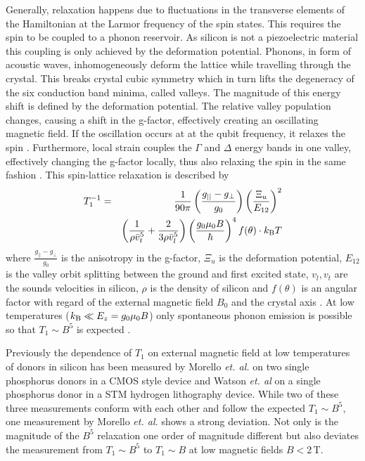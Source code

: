\documentclass[%
 reprint,
 amsmath,amssymb,
 aps,
]{revtex4-1}
\begin{document}
Generally, relaxation happens due to fluctuations in the transverse elements of the Hamiltonian at the Larmor frequency of the spin states. This requires the spin to be coupled to a phonon reservoir.
As silicon is not a piezoelectric material this coupling is only achieved by the deformation potential. Phonons, in form of acoustic waves, inhomogeneously deform the lattice while travelling through the crystal. This breaks crystal cubic symmetry which in turn lifts the degeneracy of the six conduction band minima, called valleys. The magnitude of this energy shift is defined by the deformation potential. The relative valley population changes, causing a shift in the g-factor, effectively creating an oscillating magnetic field. If the oscillation occurs at at the qubit frequency, it relaxes the spin \cite{Hasegawa1960}. Furthermore, local strain couples the $\Gamma$ and $\Delta$ energy bands in one valley, effectively changing the g-factor locally, thus also relaxing the spin in the same fashion \cite{Roth1960}. 
This spin-lattice relaxation is described by 
\begin{eqnarray}\label{eq:fullT1}
T_1^{-1} & = & \frac{1}{90\pi}\left(\frac{g_{||}-g_\perp}{g_0}\right)\left(\frac{\Xi_u}{E_{12}}\right)^2\\
& &\left(\frac{1}{\rho \bar{v}_t^5}+\frac{2}{3\rho\bar{v}_l^5}\right)\left(\frac{g_0\mu_0B}{\hbar}\right)^4f(\theta)\cdot k_{\rm B} T
\end{eqnarray}
where $\frac{g_{||}-g_\perp}{g_0}$ is the anisotropy in the g-factor, $\Xi_u$ is the deformation potential, $E_{12}$ is the valley orbit splitting between the ground and first excited state, $v_l, v_t$ are the sounds velocities in silicon, $\rho$ is the density of silicon and $f(\theta)$ is an angular factor with regard of the external magnetic field $B_0$ and the crystal axis \cite{Wilson1961}.
At low temperatures ($k_{\rm B}\ll E_z=g_0\mu_0 B$) only spontaneous phonon emission is possible so that $T_1\sim B^5$ is expected \cite{Morello2010, Zwanenburg2013}. 

Previously the dependence of $T_1$ on external magnetic field at low temperatures of donors in silicon has been measured by Morello \textit{et. al.} \cite{Morello2010} on two single phosphorus donors in a CMOS style device and Watson \textit{et. al} \cite{Watson2015} on a single phosphorus donor in a STM hydrogen lithography device. While two of these three measurements conform with each other and follow the expected $T_1\sim B^5$, one measurement by Morello \textit{et. al.} shows a strong deviation. Not only is the magnitude of the $B^5$ relaxation one order of magnitude different but also deviates the measurement from $T_1\sim B^5$ to $T_1\sim B$ at low magnetic fields $B<2\,$T.  
\end{document}
